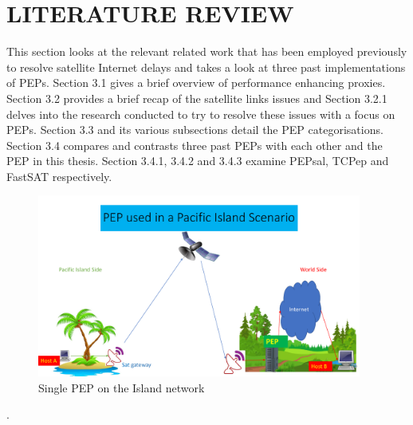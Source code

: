 
\chapter{LITERATURE REVIEW}

This section looks at the relevant related work that has been employed previously to resolve satellite Internet delays and takes a look at three past implementations of PEPs. Section 3.1 gives a brief overview of performance enhancing proxies. Section 3.2 provides a brief recap of the satellite links issues and Section 3.2.1 delves into the research conducted to try to resolve these issues with a focus on PEPs. Section 3.3 and its various subsections detail the PEP categorisations. Section 3.4 compares and contrasts three past PEPs with each other and the PEP in this thesis. Section 3.4.1, 3.4.2 and 3.4.3 examine PEPsal, TCPep and FastSAT respectively.

\begin{figure}[h!]
    \centering
    \includegraphics[width=0.95\textwidth]{PEP.pdf}
    \caption{Single PEP on the Island network}
    \label{IslandPEP}
\end{figure}.

